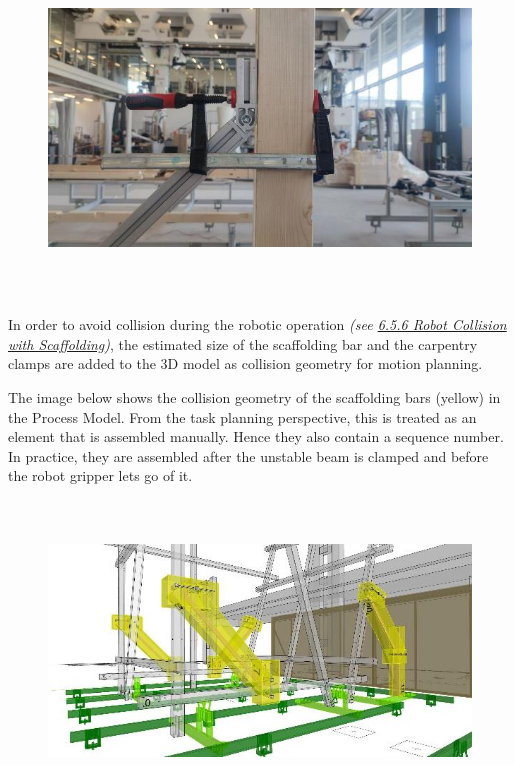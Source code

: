 \documentclass[11pt]{book}
\begin{document}
\begin{figure}[H]
\includegraphics[width=15.92cm,height=8.96cm]{./images/image10.jpeg}
\end{figure}


In order to avoid collision during the robotic operation \textit{(see \uline{6.5.6 Robot Collision with Scaffolding})}, the estimated size of the scaffolding bar and the carpentry clamps are added to the 3D model as collision geometry for motion planning.

The image below shows the collision geometry of the scaffolding bars (yellow) in the Process Model. From the task planning perspective, this is treated as an element that is assembled manually. Hence they also contain a sequence number. In practice, they are assembled after the unstable beam is clamped and before the robot gripper lets go of it.

\begin{figure}[H]
\includegraphics[width=15.92cm,height=7.97cm]{./images/image11.jpeg}
\end{figure}
\end{document}
